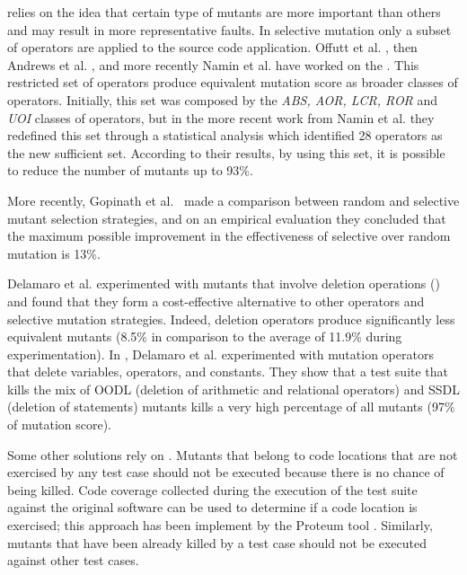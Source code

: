  relies on the idea that certain type of mutants are more important than others and may result in more representative faults. In selective mutation only a subset of operators are applied to the source code application.
Offutt et al. \cite{offutt1996experimental}, then Andrews et al. \cite{andrews2005mutation}, and more recently Namin et al. \cite{siami2008sufficient} have worked on the . This restricted set of operators produce equivalent mutation score as broader classes of operators. Initially, this set was composed by the \textit{ABS, AOR, LCR, ROR} and \textit{UOI} classes of operators, but in the more recent work from Namin et al. \cite{siami2008sufficient} they redefined this set through a statistical analysis which identified 28 operators as the new sufficient set. According to their results, by using this set, it is possible to reduce the number of mutants up to 93\%. 

More recently, Gopinath et al.~\cite{gopinath2016limits} made a comparison between random and selective mutant selection strategies, and on an empirical evaluation they concluded that the maximum possible improvement in the effectiveness of selective over random mutation is 13\%.

Delamaro et al. \cite{delamaro2014designing,delamaro2014experimental} experimented with mutants that involve deletion operations () and found that they form a cost-effective alternative to other operators and selective mutation strategies. Indeed, deletion operators produce significantly less equivalent mutants (8.5\% in comparison to the average of 11.9\% during experimentation). 
In \cite{delamaro2014experimental}, Delamaro et al. experimented with mutation operators that delete variables, operators, and constants. They show that a test suite that kills the mix of OODL (deletion of arithmetic and relational operators) and SSDL (deletion of statements) mutants kills a very high percentage of all mutants (97\% of mutation score).

Some other solutions rely on . Mutants that belong to code locations that are not exercised by any test case should not be executed because there is no chance of being killed. Code coverage collected during the execution of the test suite against the original software can be used to determine if a code location is exercised; this approach has been implement by the Proteum tool \cite{delamaro1996proteum}.
Similarly, mutants that have been already killed by a test case should not be executed against other test cases.

